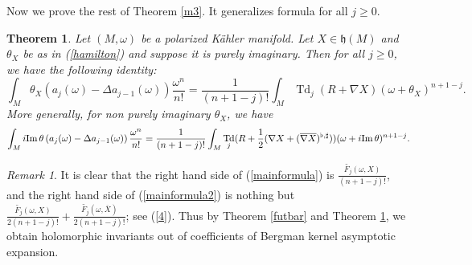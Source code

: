\documentclass[12pt,reqno,a4paper]{amsart}
\numberwithin{equation}{section}
\DeclareMathOperator{\Td}{Td}
\def\Im{{\rm Im\,}}
\newtheorem{thm}{{\sc Theorem}}[section]
\theoremstyle{remark}
\newtheorem{remark}{Remark}
\theoremstyle{dotless}
\begin{document}
Now we prove the rest of Theorem \ref{m3}. It generalizes formula \cite[(4.4)]{lu2004k} for all $j\geq 0$. 

\begin{thm}\label{mainthm}
Let $(M,\omega)$ be a polarized K\"ahler manifold. Let $X\in\mathfrak{h}(M)$ and $\theta_X$ be as in (\ref{hamilton}) and suppose it is purely imaginary. Then for all $j\geq 0$, we have the following identity:
\begin{equation}\label{mainformula}
\int_M \theta_X \left( a_j(\omega)-\Delta a_{j-1}(\omega) \right) \frac{\omega^n}{n!}= \frac{1}{(n+1-j)!}\int_M \Td_j(R+\nabla X)(\omega+\theta_X)^{n+1-j}.
\end{equation}
More generally, for non purely imaginary $\theta_X$, we have
\begin{equation}\label{mainformula2}
\int_M i\Im \theta \left( a_j(\omega)-\Delta a_{j-1}(\omega) \right) \frac{\omega^n}{n!}= \frac{1}{(n+1-j)!}\int_M \Td_j(R+\frac12(\nabla X +(\overline{\nabla X})^{\flat,\sharp}))(\omega+i\Im \theta)^{n+1-j}.
\end{equation}
\end{thm}

\begin{remark}
It is clear that the right hand side of (\ref{mainformula}) is $\frac{\widetilde{F_j}(\omega,X)}{(n+1-j)!}$, and the right hand side of (\ref{mainformula2}) is nothing but $\frac{\widetilde{F_j}(\omega,X)}{2(n+1-j)!}+\frac{\widetilde{F_j}(\omega,\overline{X})}{2(n+1-j)!}$; see (\ref{4}). Thus by Theorem \ref{futbar} and Theorem \ref{mainthm}, we obtain holomorphic invariants out of coefficients of Bergman kernel asymptotic expansion.
\end{remark}
\end{document}
